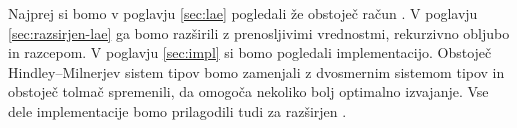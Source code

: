 

Najprej si bomo v poglavju \ref{sec:lae} pogledali že obstoječ račun \lae{}. V poglavju \ref{sec:razsirjen-lae} ga bomo razširili z prenosljivimi vrednostmi, rekurzivno obljubo in razcepom. V poglavju \ref{sec:impl} si bomo pogledali implementacijo. Obstoječ Hindley–Milnerjev sistem tipov bomo zamenjali z dvosmernim sistemom tipov in obstoječ tolmač spremenili, da omogoča nekoliko bolj optimalno izvajanje. Vse dele implementacije bomo prilagodili tudi za razširjen \lae.

